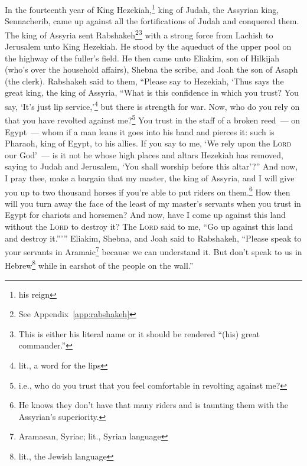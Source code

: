 
\begin{inparaenum}
     In the fourteenth year of King Hezekiah,\footnote{his reign} king of Judah, the Assyrian king, Sennacherib, came up against all the fortifications of Judah and conquered them.%
     The king of Assyria sent Rabshakeh\footnote{See Appendix~\ref{app:rabshakeh}}\footnote{This is either his literal name or it should be rendered ``(his) great commander.''} with a strong force from Lachish to Jerusalem unto King Hezekiah. He stood by the aqueduct of the upper pool on the highway of the fuller's field.%
     He then came unto Eliakim, son of Hilkijah (who's over the household affairs), Shebna the scribe, and Joah the son of Asaph (the clerk).%
     Rabshakeh said to them, ``Please say to Hezekiah, `Thus says the great king, the king of Assyria, ``What is this confidence in which you trust?%
     You say, `It's just lip service,'\footnote{lit., a word for the lips} but there is strength for war. Now, who do you rely on that you have revolted against me?\footnote{i.e., who do you trust that you feel comfortable in revolting against me?}%
     You trust in the staff of a broken reed~--- on Egypt~--- whom if a man leans it goes into his hand and pierces it: such is Pharaoh, king of Egypt, to his allies.%
     If you say to me, `We rely upon the \textsc{Lord} our God'~--- is it not he whose high places and altars Hezekiah has removed, saying to Judah and Jerusalem, `You shall worship before this altar'?''%
     And now, I pray thee, make a bargain that my master, the king of Assyria, and I will give you up to two thousand horses if you're able to put riders on them.\footnote{He knows they don't have that many riders and is taunting them with the Assyrian's superiority.}%
     How then will you turn away the face of the least of my master's servants when you trust in Egypt for chariots and horsemen?%
     And now, have I come up against this land without the \textsc{Lord} to destroy it? The \textsc{Lord} said to me, ``Go up against this land and destroy it.''\thinspace'\thinspace''%
     Eliakim, Shebna, and Joah said to Rabshakeh, ``Please speak to your servants in Aramaic\footnote{Aramaean, Syriac; lit., Syrian language} because we can understand it. But don't speak to us in Hebrew\footnote{lit., the Jewish language} while in earshot of the people on the wall.''%

\end{inparaenum}
